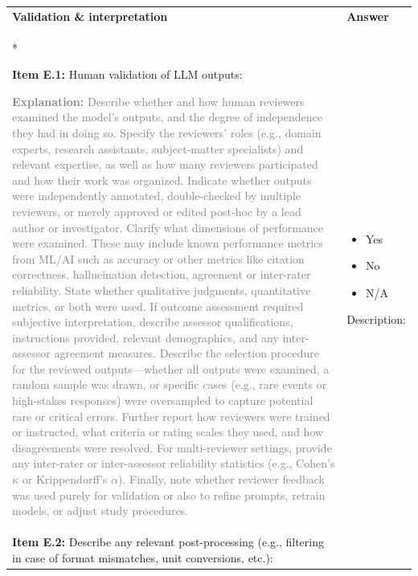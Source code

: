 \documentclass[12pt]{article}
\newcommand{\unchecked}{\ding{111}} %
\begin{document}
\begin{longtable}{|p{}|p{}|}
\hline
\rowcolor{green!20}
\textbf{{Validation \& interpretation}} & \textbf{Answer} \\*   %
\hline

\textbf{Item E.1:} Human validation of LLM outputs:

\textcolor{gray}{{\footnotesize
\textbf{Explanation:} Describe whether and how human reviewers examined the model’s outputs, and the degree of independence they had in doing so. Specify the reviewers’ roles (e.g., domain experts, research assistants, subject-matter specialists) and relevant expertise, as well as how many reviewers participated and how their work was organized. Indicate whether outputs were independently annotated, double-checked by multiple reviewers, or merely approved or edited post-hoc by a lead author or investigator.
Clarify what dimensions of performance were examined. These may include known performance metrics from ML/AI such as accuracy or other metrics like citation correctness, hallucination detection, agreement or inter-rater reliability. State whether qualitative judgments, quantitative metrics, or both were used. If outcome assessment required subjective interpretation, describe assessor qualifications, instructions provided, relevant demographics, and any inter-assessor agreement measures.
Describe the selection procedure for the reviewed outputs—whether all outputs were examined, a random sample was drawn, or specific cases (e.g., rare events or high-stakes responses) were oversampled to capture potential rare or critical errors. Further report how reviewers were trained or instructed, what criteria or rating scales they used, and how disagreements were resolved. For multi-reviewer settings, provide any inter-rater or inter-assessor reliability statistics (e.g., Cohen’s $\kappa$ or Krippendorff's $\alpha$). Finally, note whether reviewer feedback was used purely for validation or also to refine prompts, retrain models, or adjust study procedures.
}}
&
\begin{itemize}[leftmargin=*]\setlength{\itemsep}{0pt}\setlength{\parskip}{0pt}
    \item[\unchecked] Yes
    \item[\unchecked] No
    \item[\unchecked] N/A
\end{itemize}

Description:\\
\hline
\textbf{Item E.2:} Describe any relevant post-processing (e.g., filtering in case of format mismatches, unit conversions, etc.):


\end{longtable}
\end{document}
